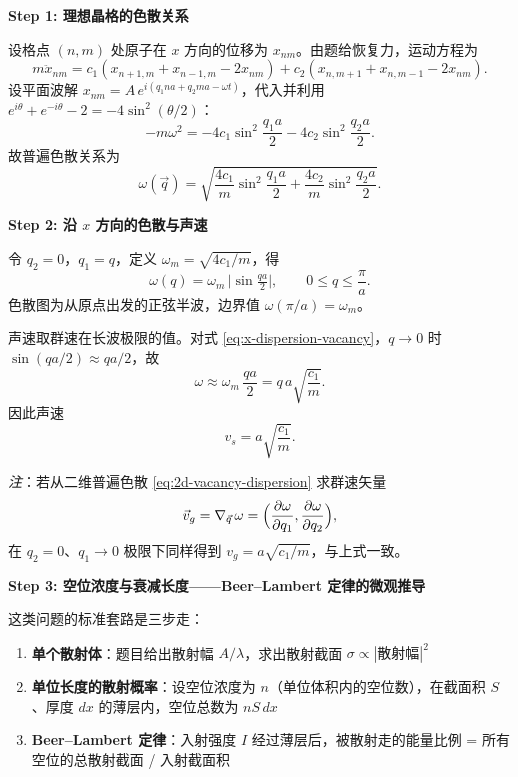 \begin{derivationbox}[标准解题过程]
\textbf{Step 1: 理想晶格的色散关系}

设格点 $(n,m)$ 处原子在 $x$ 方向的位移为 $x_{nm}$。由题给恢复力，运动方程为
\begin{equation}
m\ddot x_{nm} = c_1(x_{n+1,m}+x_{n-1,m}-2x_{nm}) + c_2(x_{n,m+1}+x_{n,m-1}-2x_{nm}).
\label{eq:vacancy-motion}
\end{equation}
设平面波解 $x_{nm}=A\,e^{i(q_1 na+q_2 ma-\omega t)}$，代入并利用 $e^{i\theta}+e^{-i\theta}-2=-4\sin^2(\theta/2)$：
\begin{equation}
-m\omega^2 = -4c_1\sin^2\frac{q_1 a}{2} - 4c_2\sin^2\frac{q_2 a}{2}.
\end{equation}
故普遍色散关系为
\begin{equation}
\boxed{\omega(\vec q) = \sqrt{\frac{4c_1}{m}\sin^2\frac{q_1 a}{2} + \frac{4c_2}{m}\sin^2\frac{q_2 a}{2}}.}
\label{eq:2d-vacancy-dispersion}
\end{equation}

\textbf{Step 2: 沿 $x$ 方向的色散与声速}

令 $q_2=0$，$q_1=q$，定义 $\omega_m=\sqrt{4c_1/m}$，得
\begin{equation}
\boxed{\omega(q) = \omega_m\,\bigl|\sin\tfrac{qa}{2}\bigr|, \qquad 0\le q\le\frac{\pi}{a}.}
\label{eq:x-dispersion-vacancy}
\end{equation}
色散图为从原点出发的正弦半波，边界值 $\omega(\pi/a)=\omega_m$。

声速取群速在长波极限的值。对式 \eqref{eq:x-dispersion-vacancy}，$q\to0$ 时 $\sin(qa/2)\approx qa/2$，故
\begin{equation}
\omega \approx \omega_m\,\frac{qa}{2} = q\,a\sqrt{\frac{c_1}{m}}.
\end{equation}
因此声速
\begin{equation}
\boxed{v_s = a\sqrt{\frac{c_1}{m}}.}
\end{equation}

\textit{注}：若从二维普遍色散 \eqref{eq:2d-vacancy-dispersion} 求群速矢量
\[
\vec v_g = \nabla_{\vec q}\,\omega = \Bigl(\frac{\partial\omega}{\partial q_1},\frac{\partial\omega}{\partial q_2}\Bigr),
\]
在 $q_2=0$、$q_1\to0$ 极限下同样得到 $v_g=a\sqrt{c_1/m}$，与上式一致。

\textbf{Step 3: 空位浓度与衰减长度——Beer--Lambert 定律的微观推导}

\begin{insightbox}
这类问题的标准套路是三步走：
\begin{enumerate}
    \item \textbf{单个散射体}：题目给出散射幅 $A/\lambda$，求出散射截面 $\sigma\propto|{\text{散射幅}}|^2$
    \item \textbf{单位长度的散射概率}：设空位浓度为 $n$（单位体积内的空位数），在截面积 $S$、厚度 $dx$ 的薄层内，空位总数为 $nS\,dx$
    \item \textbf{Beer--Lambert 定律}：入射强度 $I$ 经过薄层后，被散射走的能量比例 = 所有空位的总散射截面 / 入射截面积
\end{enumerate}
\end{insightbox}


\end{derivationbox}
